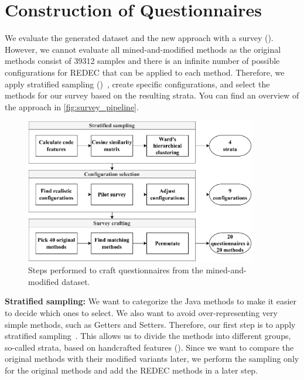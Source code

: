 \documentclass[%
class=scrreprt,
chapterprefix=false,%
open=right,%
twoside=true,%
paper=a4,%
logofile={Logo\_zentral\_farbig\_EN.png},%
thesistype=master,%
UKenglish,%
]{se2thesis}
\theoremstyle{definition}
\newcommand{\numOriginal}{39312\xspace}
\newcommand{\rdh}{REDEC\xspace}
\begin{document}
\section{Construction of Questionnaires} \label{Construction of Questionnaires}
	We evaluate the generated dataset and the new approach with a survey (). However, we cannot evaluate all mined-and-modified methods as the original methods consist of \numOriginal samples and there is an infinite number of possible configurations for \rdh that can be applied to each method.
	Therefore, we apply stratified sampling ()~\cite{thompson2012sampling}, create specific configurations, and select the methods for our survey based on the resulting strata. You can find an overview of the approach in \autoref{fig:survey_pipeline}.
	
	\begin{figure}[tb]
		\centering
		\includegraphics[width=0.9\textwidth]{img/survey_pipeline.pdf}
		\caption{Steps performed to craft questionnaires from the mined-and-modified dataset.}
		\label{fig:survey_pipeline}
	\end{figure}
	
	\textbf{Stratified sampling:} 
	We want to categorize the Java methods to make it easier to decide which ones to select. We also want to avoid over-representing very simple methods, such as Getters and Setters. Therefore, our first step is to apply stratified sampling~\cite{thompson2012sampling}. This allows us to divide the methods into different groups, so-called strata, based on handcrafted features ().
	Since we want to compare the original methods with their modified variants later, we perform the sampling only for the original methods and add the \rdh methods in a later step.
\end{document}
